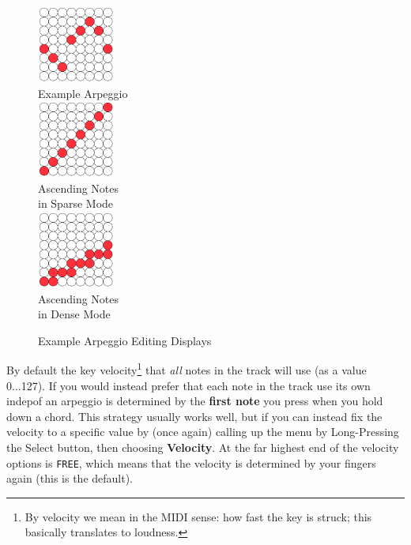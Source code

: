 \documentclass{article}
\begin{document}
\begin{figure}
\begin{center}
\vspace{-1.5em}\includegraphics[width=1in]{arpeggioexample.pdf}\\
Example Arpeggio\\[2em]
\vspace{-1.5em}\includegraphics[width=1in]{arpeggioup.pdf}\\
Ascending Notes\\in Sparse Mode\\[2em]
\vspace{-1.5em}\includegraphics[width=1in]{arpeggiodoubleup.pdf}\\
Ascending Notes\\in Dense Mode\\
\end{center}
\vspace{-1em}\caption{\small Example Arpeggio Editing Displays}
\vspace{-2em}
\label{arpeggioediting}
\end{figure}


By default the key velocity\footnote{By velocity we mean in the MIDI sense: how fast the key is struck; this basically translates to loudness.} that {\it all} notes in the track will use (as a value 0...127).  If you would instead prefer that each note in the track use its own indepof an arpeggio is determined by the {\bf first note} you press when you hold down a chord.  This strategy usually works well, but if you can instead fix the velocity to a specific value by (once again) calling up the menu by Long-Pressing the Select button, then choosing {\bf Velocity}.  At the far highest end of the velocity options is \texttt{FREE}, which means that the velocity is determined by your fingers again (this is the default).
\end{document}
